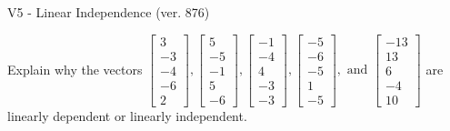 \begin{exercise}
  \begin{exerciseTitle}V5 - Linear Independence (ver. 876)\end{exerciseTitle}
  \begin{exerciseStatement}
    Explain why the vectors \(\left[\begin{array}{r}
3 \\
-3 \\
-4 \\
-6 \\
2
\end{array}\right] , \left[\begin{array}{r}
5 \\
-5 \\
-1 \\
5 \\
-6
\end{array}\right] , \left[\begin{array}{r}
-1 \\
-4 \\
4 \\
-3 \\
-3
\end{array}\right] , \left[\begin{array}{r}
-5 \\
-6 \\
-5 \\
1 \\
-5
\end{array}\right] , \text{ and } \left[\begin{array}{r}
-13 \\
13 \\
6 \\
-4 \\
10
\end{array}\right]\) are linearly dependent or linearly independent.	



\end{exerciseStatement}
\end{exercise}
